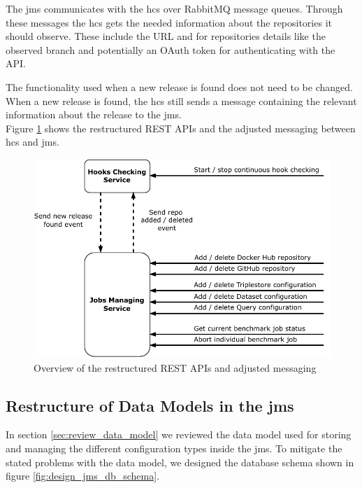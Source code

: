 The \ac{jms} communicates with the \ac{hcs} over RabbitMQ message queues.
Through these messages the \ac{hcs} gets the needed information about the repositories it should observe.
These include the URL and for \gh{} repositories details like the observed branch and potentially an OAuth token for authenticating with the API.

The functionality used when a new release is found does not need to be changed.
When a new release is found, the \ac{hcs} still sends a message containing the relevant information about the release to the \ac{jms}.
\\

Figure \ref{fig:repo_management_restructure} shows the restructured REST APIs and the adjusted messaging between \ac{hcs} and \ac{jms}.

\begin{figure}[tbph]
	\centering
	\includegraphics[width=.65\textwidth]{figures/messaging-implementation-hcs-jms.pdf}
	\caption{Overview of the restructured REST APIs and adjusted messaging}
	\label{fig:repo_management_restructure}
\end{figure}



\subsection{Restructure of Data Models in the \acl{jms}}
\label{sec:data_model_restructure_jms}
In section \ref{sec:review_data_model} we reviewed the data model used for storing and managing the different configuration types inside the \ac{jms}.
To mitigate the stated problems with the data model, we designed the database schema shown in figure \ref{fig:design_jms_db_schema}.

